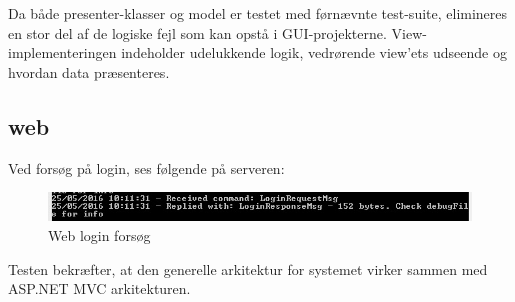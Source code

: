 Da både presenter-klasser og model er testet med førnævnte test-suite, elimineres en stor del af de logiske fejl som kan opstå i GUI-projekterne. View-implementeringen indeholder udelukkende logik, vedrørende view’ets udseende og hvordan data præsenteres.

\subsection{web}
Ved forsøg på login, ses følgende på serveren:

\begin{figure}
	\centering
	\includegraphics[width=1.0\linewidth]{figs/implementering/webtest}
	\caption{Web login forsøg}
	\label{fig:weblogintry}
\end{figure}

Testen bekræfter, at den generelle arkitektur for systemet virker sammen med ASP.NET MVC arkitekturen. 